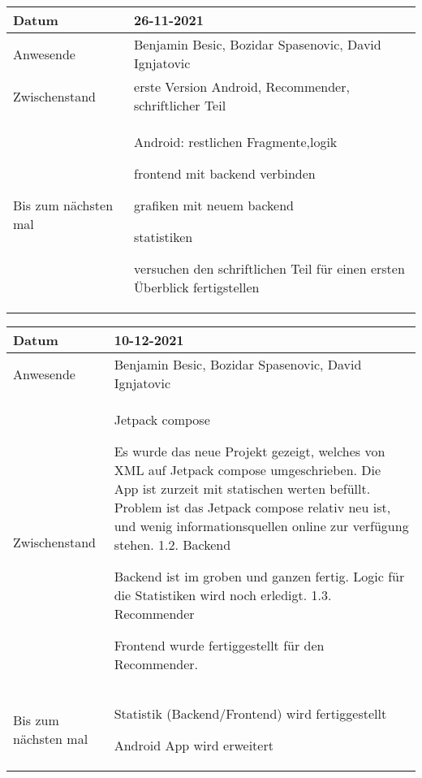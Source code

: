\begin{center}
    \begin{tabular}{ |p{3cm}|p{10cm}|  }
        \hline
        Datum & 26-11-2021\\
        \hline
        Anwesende & Benjamin Besic, Bozidar Spasenovic, David Ignjatovic\\

        \hline
        Zwischenstand&  erste Version Android, Recommender, schriftlicher Teil
    
    \\
        \hline
        Bis zum nächsten mal &  

       Android: restlichen Fragmente,logik
        

    frontend mit backend verbinden

    grafiken mit neuem backend

    statistiken

    versuchen den schriftlichen Teil für einen ersten Überblick fertigstellen


    
    \\
        \hline
    \end{tabular}
\end{center}
\begin{center}
    \begin{tabular}{ |p{3cm}|p{10cm}|  }
        \hline
        Datum & 10-12-2021\\
        \hline
        Anwesende & Benjamin Besic, Bozidar Spasenovic, David Ignjatovic\\

        \hline
        Zwischenstand&  Jetpack compose

        Es wurde das neue Projekt gezeigt, welches von XML auf Jetpack compose umgeschrieben.
        Die App ist zurzeit mit statischen werten befüllt.
        Problem ist das Jetpack compose relativ neu ist, und wenig informationsquellen online zur verfügung stehen.
        1.2. Backend
        
        Backend ist im groben und ganzen fertig. Logic für die Statistiken wird noch erledigt.
        1.3. Recommender
        
        Frontend wurde fertiggestellt für den Recommender.
        \\
        \hline
        Bis zum nächsten mal &  



        Statistik (Backend/Frontend) wird fertiggestellt

        Android App wird erweitert
    
    
    
    \\
        \hline
    \end{tabular}
\end{center}
